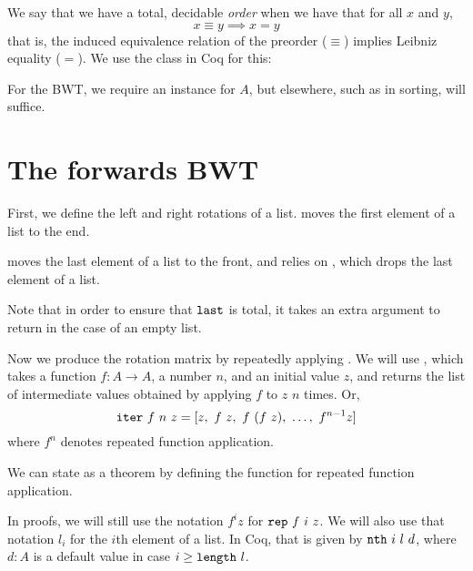 \documentclass[sigplan,10pt,anonymous,review]{thesis}
\begin{document}
We say that we have a total, decidable \textit{order} when we have
that for all $x$ and $y$,
\begin{equation*}
  x \equiv y \implies x = y
\end{equation*}
that is, the induced equivalence relation of the preorder ($\equiv$)
implies Leibniz equality ($=$). We use the  class in Coq
for this:

For the BWT, we require an  instance for $A$, but
elsewhere, such as in sorting,  will suffice.

\section{The forwards BWT}
\label{sec:forwards_BWT}

First, we define the left and right rotations of a list. 
moves the first element of a list to the end.

 moves the last element of a list to the front, and
relies on , which drops the last element of a list.


Note that in order to ensure that $\texttt{last}$ is total, it takes
an extra argument to return in the case of an empty list.

Now we produce the rotation matrix by repeatedly applying .
We will use , which takes a function $f : A \to A$, a number
$n$, and an initial value $z$, and returns the list of intermediate
values obtained by applying $f$ to $z$ $n$ times. Or,
\begin{equation}
  \texttt{iter}~f~n~z = [z,~f~z,~f~(f~z),~\ldots,~f^{n-1} z]
  \label{eq:iter}
\end{equation}
where $f^n$ denotes repeated function application.


We can state  as a theorem by defining the
function  for repeated function application.

In proofs, we will still use the notation $f^i z$ for
$\texttt{rep}~f~i~z$. We will also use that notation $l_i$ for the $i$th
element of a list. In Coq, that is given by $\texttt{nth}~i~l~d$, where
$d:A$ is a default value in case $i \ge \texttt{length}~l$.
\end{document}
